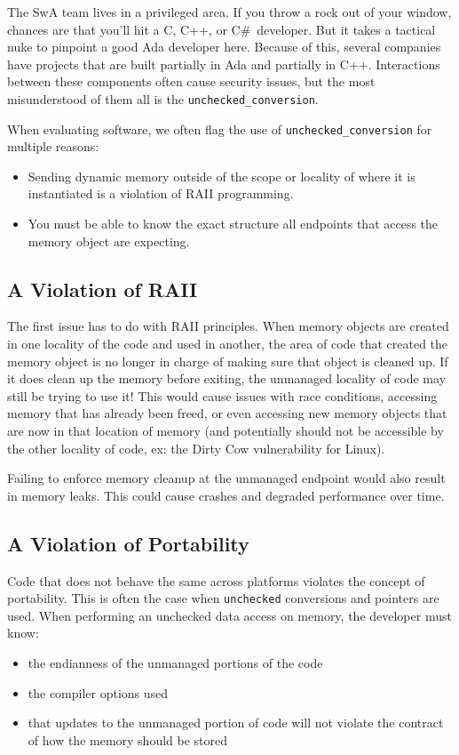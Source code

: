 The SwA team lives in a privileged area. If you throw a rock out of your window, chances are that you'll hit a C, C++, or C\#\ developer. But it takes a tactical nuke to pinpoint a good Ada developer here. Because of this, several companies have projects that are built partially in Ada and partially in C++. Interactions between these components often cause security issues, but the most misunderstood of them all is the \texttt{unchecked\_conversion}.

When evaluating software, we often flag the use of \texttt{unchecked\_conversion} for multiple reasons:
\begin{itemize}
	\item Sending dynamic memory outside of the scope or locality of where it is instantiated is a violation of RAII programming.
	\item You must be able to know the exact structure all endpoints that access the memory object are expecting.
\end{itemize}

\subsection{A Violation of RAII}
The first issue has to do with RAII principles. When memory objects are created in one locality of the code and used in another, the area of code that created the memory object is no longer in charge of making sure that object is cleaned up. If it does clean up the memory before exiting, the unmanaged locality of code may still be trying to use it! This would cause issues with race conditions, accessing memory that has already been freed, or even accessing new memory objects that are now in that location of memory (and potentially should not be accessible by the other locality of code, ex: the Dirty Cow vulnerability for Linux).

Failing to enforce memory cleanup at the unmanaged endpoint would also result in memory leaks. This could cause crashes and degraded performance over time.

\subsection{A Violation of Portability}
Code that does not behave the same across platforms violates the concept of portability. This is often the case when \texttt{unchecked} conversions and pointers are used. When performing an unchecked data access on memory, the developer must know:
\begin{itemize}
	\item the endianness of the unmanaged portions of the code
	\item the compiler options used
	\item that updates to the unmanaged portion of code will not violate the contract of how the memory should be stored
\end{itemize}

